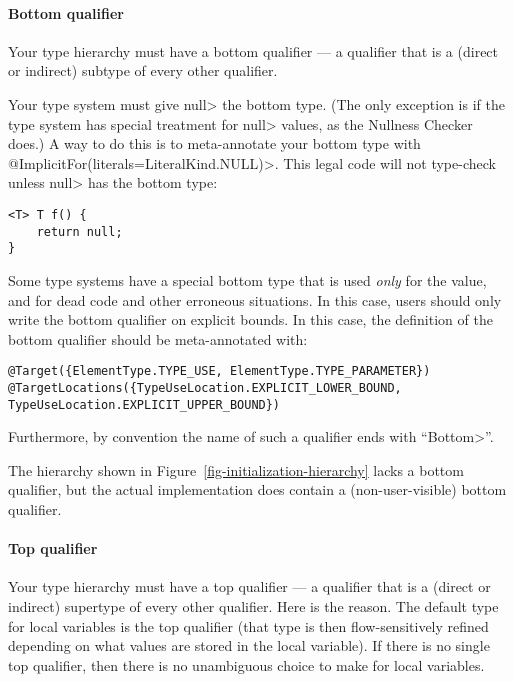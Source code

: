 \paragraph{Bottom qualifier\label{creating-bottom-qualifier}}
Your type hierarchy must have a bottom qualifier
--- a qualifier that is a (direct or indirect) subtype of every other
qualifier.

Your type system must give \<null> the bottom type.
(The only exception
is if the type system has special treatment for \<null> values, as the
Nullness Checker does.)
A way to do this is to meta-annotate your bottom type with
\<@ImplicitFor(literals=LiteralKind.NULL)>.
This legal code
will not type-check unless \<null> has the bottom type:
\begin{Verbatim}
<T> T f() {
    return null;
}
\end{Verbatim}


Some type systems have a special bottom type that is used \emph{only} for
the  value, and for dead code and other erroneous situations.
In this case, users should only write the bottom qualifier on explicit
bounds.  In this case, the definition of the bottom qualifier should be
meta-annotated with:

%
\begin{Verbatim}
@Target({ElementType.TYPE_USE, ElementType.TYPE_PARAMETER})
@TargetLocations({TypeUseLocation.EXPLICIT_LOWER_BOUND, TypeUseLocation.EXPLICIT_UPPER_BOUND})
\end{Verbatim}

Furthermore, by convention the name of such a qualifier ends with ``\<Bottom>''.

The hierarchy shown in Figure~\ref{fig-initialization-hierarchy} lacks
a bottom qualifier, but the actual implementation does contain a (non-user-visible) bottom qualifier.


\paragraph{Top qualifier\label{creating-top-qualifier}}
Your type hierarchy must have a top qualifier
--- a qualifier that is a (direct or indirect) supertype of every other
qualifier.
Here is the reason.
The default type for local variables is the top
qualifier (that type is then flow-sensitively
refined depending on what values are stored in the local variable).
If there is no single top qualifier, then there is no
unambiguous choice to make for local variables.


